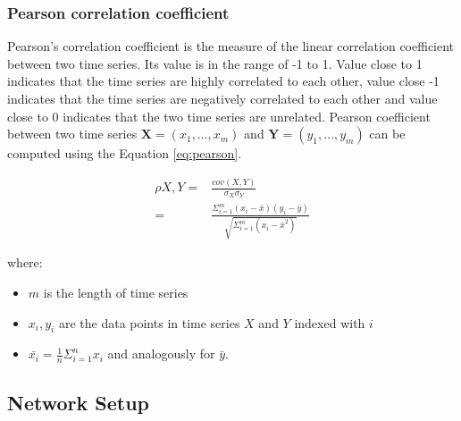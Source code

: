  
 
 \subsubsection{Pearson correlation coefficient}
  Pearson's correlation coefficient is the measure of the linear correlation coefficient between two time series. Its value is in the range of -1 to 1. Value close to 1 indicates that the time series are highly correlated to each other, value close -1 indicates that the time series are negatively correlated to each other and value close to 0 indicates that the two time series are unrelated. Pearson coefficient between two time series $\mathbf{X} = (x_1, \hdots, x_m)$ and $\mathbf{Y} = (y_1, \hdots, y_m)$ can be computed using the Equation \eqref{eq:pearson}.
  
  \begin{equation}
  \begin{split}
	  \rho X,Y =& \frac{cov(X,Y)}{\sigma_X \sigma_Y}\\
		=& \frac{\Sigma^{m}_{i=1}(x_i - \bar{x})(y_i - \bar{y})} {\sqrt{\Sigma^m_{i=1}(x_i - \bar{x}^2)}}
  \end{split}
   \label{eq:pearson}
  \end{equation}
  
  where:
  \begin{itemize}
	  \item $m$ is the length of time series
	  \item $x_i, y_i$ are the data points in time series $X$ and $Y$ indexed with $i$
	  \item $\bar{x_i} = \frac{1}{n}\Sigma_{i=1}^{n}x_i$  and analogously for $\bar{y}$.
	  
	  \end{itemize}
 
 




%


\subsection{Network Setup}
\indent \indent
    
